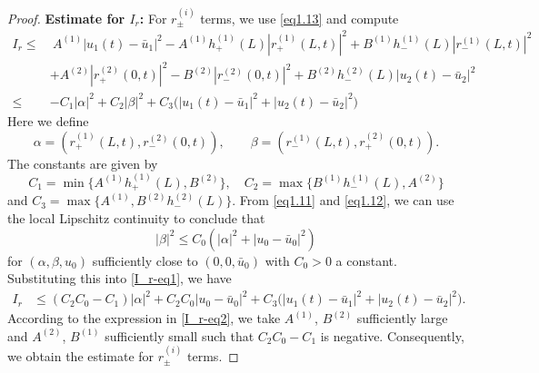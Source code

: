 \documentclass[12pt]{article}
\numberwithin{equation}{section}
\begin{document}
\begin{proof}
\textbf{Estimate for $I_r$:} For $r_\pm^{(i)}$ terms, we use \eqref{eq1.13} and compute  
\begin{align}
I_r
\leq&~ A^{(1)} |u_1(t)-\bar{u}_1|^2 
-A^{(1)}h_+^{(1)}(L)|r_+^{(1)}(L,t)|^2+B^{(1)}h_-^{(1)}(L)|r_-^{(1)}(L,t)|^2 \nonumber\\[2mm]
&+A^{(2)} |r_+^{(2)}(0,t)|^2-B^{(2)} |r_-^{(2)}(0,t)|^2
 +B^{(2)}h_-^{(2)}(L)|u_2(t)-\bar{u}_2|^2\nonumber \\[2mm]
 \leq& -C_1|\alpha|^2+C_2|\beta|^2 +C_3\big(|u_1(t)-\bar{u}_1|^2+|u_2(t)-\bar{u}_2|^2\big)\label{I_r-eq1}
\end{align}
Here we define $$\alpha=(r_+^{(1)}(L,t), r_-^{(2)}(0,t)),\qquad \beta=(r_-^{(1)}(L,t), r_+^{(2)}(0,t)).$$
The constants are given by  
\begin{equation}\label{I_r-eq2}
C_1=\min\{A^{(1)}h_+^{(1)}(L), B^{(2)} \} ,\quad C_2=\max\{B^{(1)}h_-^{(1)}(L), A^{(2)} \}
\end{equation}
and $C_3=\max\{A^{(1)}, B^{(2)}h_-^{(2)}(L)\}$.
From \eqref{eq1.11} and \eqref{eq1.12}, we can use the local Lipschitz continuity to conclude that
\begin{equation}\label{beta-au}
|\beta|^2\leq C_0(|\alpha|^2+|u_0-\bar{u}_0|^2)
\end{equation}
for $(\alpha,\beta,u_0)$ sufficiently close to $(0,0,\bar{u}_0)$ with $C_0>0$ a constant.
Substituting this into \eqref{I_r-eq1}, we have 
\begin{align*}
    I_r &\leq (C_2C_0-C_1)|\alpha|^2+C_2C_0 |u_0-\bar{u}_0|^2+C_3\big(|u_1(t)-\bar{u}_1|^2+|u_2(t)-\bar{u}_2|^2\big).
\end{align*}
According to the expression in \eqref{I_r-eq2}, we take $A^{(1)}$, $B^{(2)}$ sufficiently large and $A^{(2)}$, $B^{(1)}$ sufficiently small such that $C_2C_0-C_1$ is negative. Consequently, we obtain the estimate for $r_\pm^{(i)}$ terms.


\end{proof}
\end{document}
